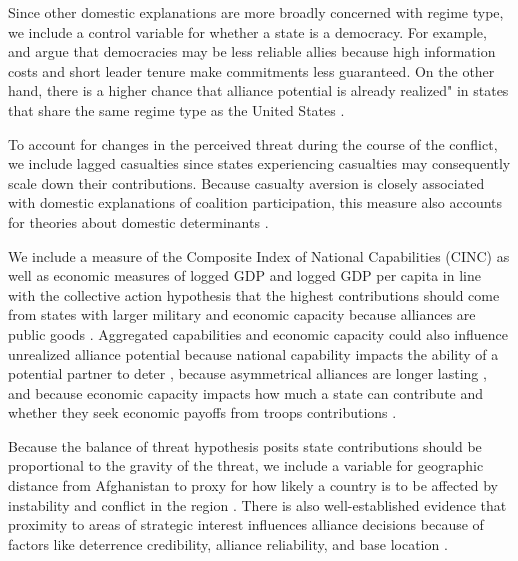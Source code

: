 \documentclass[12pt,letterpaper]{article}
\begin{document}
		Since other domestic explanations are more broadly concerned with regime type, we include a control variable for whether a state is a democracy. For example, \citet{gartzke_democracypreparationwar_2001} and \citet{gartzke_whydemocraciesmay_2004} argue that democracies may be less reliable allies because high information costs and short leader tenure make commitments less guaranteed. On the other hand, there is a higher chance that alliance potential is already realized" in states that share the same regime type as the United States \citep{simon_politicalsystemsimilarity_1996, gibler_alliancesthendemocracy_2006}.

        To account for changes in the perceived threat during the course of the conflict, we include lagged casualties since states experiencing casualties may consequently scale down their contributions. Because casualty aversion is closely associated with domestic explanations of coalition participation, this measure also accounts for theories about domestic determinants \citep{koch_casualtiesconstituenciesdemocratic_2005, jakobsen_denmarkafghanistanworth_2015}.
                		
        We include a measure of the Composite Index of National Capabilities (CINC) as well as economic measures of logged GDP and logged GDP per capita in line with the collective action hypothesis that the highest contributions should come from states with larger military and economic capacity because alliances are public goods \citep{olson_economictheoryalliances_1966, singer_capabilitydistributionuncertainty_1972}. Aggregated capabilities and economic capacity could also influence unrealized alliance potential because national capability impacts the ability of a potential partner to deter \citep{walt_originsalliance_1987}, because asymmetrical alliances are longer lasting \citep{morrow_alliancesasymmetryalternative_1991, blankenship_promisespressurereassurance_2017}, and because economic capacity impacts how much a state can contribute and whether they seek economic payoffs from troops contributions \citep{bove_supplyingpeaceparticipation_2011, henke_buyingalliespayment_2019}.

        Because the balance of threat hypothesis posits state contributions should be proportional to the gravity of the threat, we include a variable for geographic distance from Afghanistan to proxy for how likely a country is to be affected by instability and conflict in the region \citep{weidmann_geographyinternationalsystem_2010}. There is also well-established evidence that proximity to areas of strategic interest influences alliance decisions because of factors like deterrence credibility, alliance reliability, and base location \citep{joyce_geographicproximitythirdparty_2013, bak_allianceproximityeffectiveness_2018, nieman_internationalgamerisk_2020}.
        	
\end{document}
